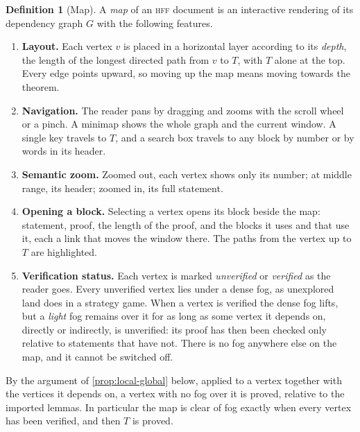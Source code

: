 \documentclass[11pt]{article}
\theoremstyle{plain}
\theoremstyle{definition}
\newtheorem{definition}[theorem]{Definition}
\theoremstyle{remark}
\theoremstyle{definition}
\theoremstyle{plain}
\theoremstyle{remark}
\newcommand{\HFF}{\textsc{hff}}
\begin{document}
\begin{definition}[Map]\label{def:map}
A \emph{map} of an \HFF{} document is an interactive rendering of its dependency graph $G$ with the following features.
\begin{enumerate}[label=\textbf{(M\arabic*)}, leftmargin=3.2em]
  \item\label{M:layout} \textbf{Layout.} Each vertex $v$ is placed in a horizontal layer according to its \emph{depth}, the length of the longest directed path from $v$ to $T$, with $T$ alone at the top. Every edge points upward, so moving up the map means moving towards the theorem.
  \item\label{M:nav} \textbf{Navigation.} The reader pans by dragging and zooms with the scroll wheel or a pinch. A minimap shows the whole graph and the current window. A single key travels to $T$, and a search box travels to any block by number or by words in its header.
  \item\label{M:zoom} \textbf{Semantic zoom.} Zoomed out, each vertex shows only its number; at middle range, its header; zoomed in, its full statement.
  \item\label{M:open} \textbf{Opening a block.} Selecting a vertex opens its block beside the map: statement, proof, the length of the proof, and the blocks it uses and that use it, each a link that moves the window there. The paths from the vertex up to $T$ are highlighted.
  \item\label{M:status} \textbf{Verification status.} Each vertex is marked \emph{unverified} or \emph{verified} as the reader goes. Every unverified vertex lies under a dense fog, as unexplored land does in a strategy game. When a vertex is verified the dense fog lifts, but a \emph{light} fog remains over it for as long as some vertex it depends on, directly or indirectly, is unverified: its proof has then been checked only relative to statements that have not. There is no fog anywhere else on the map, and it cannot be switched off.
\end{enumerate}
\end{definition}

By the argument of \cref{prop:local-global} below, applied to a vertex together with the vertices it depends on, a vertex with no fog over it is proved, relative to the imported lemmas. In particular the map is clear of fog exactly when every vertex has been verified, and then $T$ is proved.
\end{document}
